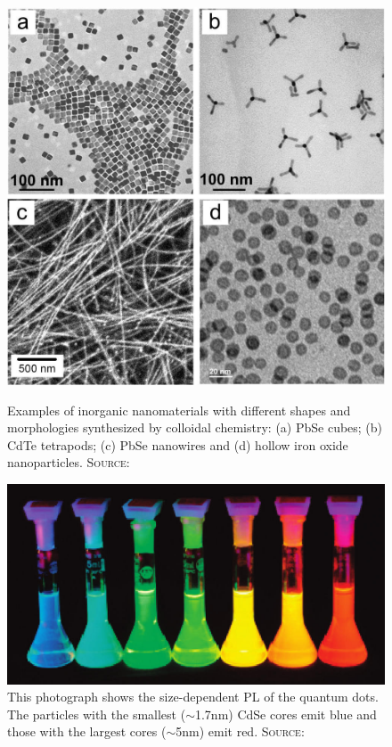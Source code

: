 	\begin{figure}[htbp]
		\begin{minipage}[t]{0.49\textwidth}
			\centering
			\includegraphics[width=\textwidth]{Fig/QDshapes.jpg}
			\caption{Examples of inorganic nanomaterials with different
							 shapes and morphologies synthesized by colloidal chemistry:
							 (a) PbSe cubes; (b) CdTe tetrapods; (c) PbSe nanowires and
							 (d) hollow iron oxide nanoparticles.
							 {\scshape Source:} \cite[p.394]{Talapin}}
			\label{fig:QDshapes}
		\end{minipage}
		\hfill
		\begin{minipage}[t]{0.49\textwidth}
			\centering
			\includegraphics[width=\textwidth]{Fig/QDcolor.jpg}
			\caption{This photograph shows the size-dependent \gls{PL} of the quantum dots. The particles with the smallest ($\sim$1.7nm)
							 CdSe cores emit blue and those with the largest cores ($\sim$5nm) emit red.
							 {\scshape Source:} \cite[p.393]{Talapin}}
			\label{fig:QDTheory}
		\end{minipage}
	\end{figure}			

